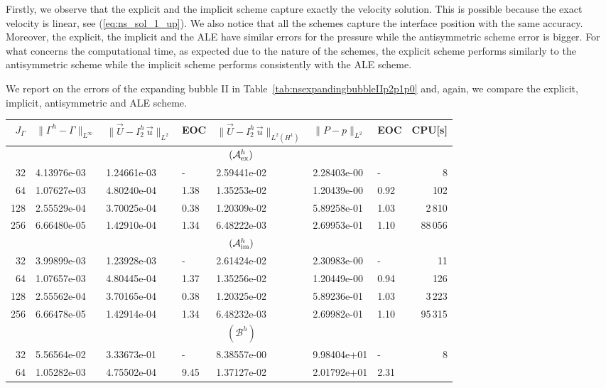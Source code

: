 \documentclass[a4paper,12pt,onecolumn]{article}
\newcommand{\errorXx}{\|\Gamma^h - \Gamma\|_{L^\infty}}
\newcommand{\LerrorUu}[1]{\|\vec U - I^h_{#1}\,\vec u\|_{L^2}}
\newcommand{\HerrorUu}[1]{\|\vec U - I^h_{#1}\,\vec u\|_{L^2(H^1)}}
\newcommand{\LerrorPp}{\|P - p\|_{L^2}}
\newcommand{\schemeAex}{{\mathcal{A}^h_{\rm ex}}}
\newcommand{\schemeAim}{{\mathcal{A}^h_{\rm im}}}
\newcommand{\schemeB}{{\mathcal{B}^h}}
\begin{document}
Firstly, we observe that the explicit and the implicit scheme capture exactly
the velocity solution. This is possible because the exact velocity is linear,
see (\ref{eq:ns_sol_1_up}). We  also notice that all the schemes capture the
interface position with the same accuracy. Moreover, the explicit, the implicit
and the ALE have similar errors for the pressure while the antisymmetric scheme
error is bigger. For what concerns the computational time, as expected due to
the nature  of the schemes, the explicit scheme performs similarly to the
antisymmetric scheme while the implicit scheme performs consistently with the
ALE scheme.

We report on the errors of the expanding bubble II in
Table~\ref{tab:nsexpandingbubbleIIp2p1p0} and, again, we compare the explicit,
implicit, antisymmetric and ALE scheme.
\begin{table}
\center
\hspace*{-3.25cm}
\begin{tabular}{rllllllr}
\hline
$J_\Gamma$ & $\errorXx$ & $\LerrorUu2$ & EOC & $\HerrorUu2$ & $\LerrorPp$ & EOC
& CPU[s] \\
\hline
& \multicolumn{7}{c}{$(\schemeAex)$} \\
\hline
 32 & 4.13976e-03 & 1.24661e-03 &    - & 2.59441e-02 & 2.28403e-00 &    - &
8 \\
 64 & 1.07627e-03 & 4.80240e-04 & 1.38 & 1.35253e-02 & 1.20439e-00 & 0.92 &
102 \\
128 & 2.55529e-04 & 3.70025e-04 & 0.38 & 1.20309e-02 & 5.89258e-01 & 1.03 &
2\,810 \\
256 & 6.66480e-05 & 1.42910e-04 & 1.34 & 6.48222e-03 & 2.69953e-01 & 1.10 &
88\,056 \\
\hline
& \multicolumn{7}{c}{$(\schemeAim)$} \\
\hline
 32 & 3.99899e-03 & 1.23928e-03 &    - & 2.61424e-02 & 2.30983e-00 &    - &
11 \\
 64 & 1.07657e-03 & 4.80445e-04 & 1.37 & 1.35256e-02 & 1.20449e-00 & 0.94 &
126 \\
128 & 2.55562e-04 & 3.70165e-04 & 0.38 & 1.20325e-02 & 5.89236e-01 & 1.03 &
3\,223 \\
256 & 6.66478e-05 & 1.42914e-04 & 1.34 & 6.48232e-03 & 2.69982e-01 & 1.10 &
95\,315 \\
\hline
& \multicolumn{7}{c}{$(\schemeB)$} \\
\hline
 32 & 5.56564e-02 & 3.33673e-01 &    - & 8.38557e-00 & 9.98404e+01 &    - &
8 \\
 64 & 1.05282e-03 & 4.75502e-04 & 9.45 & 1.37127e-02 & 2.01792e+01 & 2.31 &

\end{tabular}
\end{table}
\end{document}
